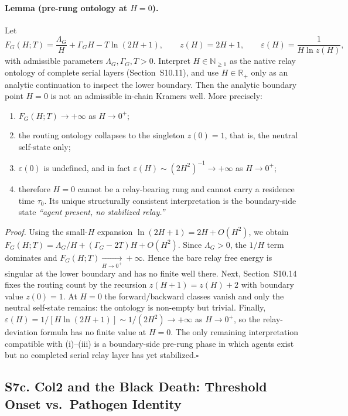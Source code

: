 \documentclass[11pt]{article}
\begin{document}
\paragraph{Lemma (pre-rung ontology at $H{=}0$).}
Let
\[
F_G(H;T)=\frac{\Lambda_G}{H}+\Gamma_G H-T\ln(2H+1),\qquad
z(H)=2H+1,\qquad
\varepsilon(H)=\frac{1}{H\ln z(H)},
\]
with admissible parameters $\Lambda_G,\Gamma_G,T>0$. Interpret
$H\in\mathbb{N}_{\ge 1}$ as the native relay ontology of complete serial
layers (Section~S10.11), and use $H\in\mathbb{R}_{+}$ only as an analytic
continuation to inspect the lower boundary. Then the analytic boundary
point $H{=}0$ is not an admissible in-chain Kramers well. More precisely:
\begin{enumerate}
\item[(i)] $F_G(H;T)\to +\infty$ as $H\to 0^{+}$;
\item[(ii)] the routing ontology collapses to the singleton $z(0)=1$,
that is, the neutral self-state only;
\item[(iii)] $\varepsilon(0)$ is undefined, and in fact
$\varepsilon(H)\sim (2H^{2})^{-1}\to+\infty$ as $H\to 0^{+}$;
\item[(iv)] therefore $H{=}0$ cannot be a relay-bearing rung and cannot
carry a residence time $\tau_{0}$. Its unique structurally consistent
interpretation is the boundary-side state
\emph{``agent present, no stabilized relay.''}
\end{enumerate}

\emph{Proof.}
Using the small-$H$ expansion $\ln(2H+1)=2H+O(H^{2})$, we obtain
$F_G(H;T)=\Lambda_G/H+(\Gamma_G-2T)H+O(H^{2})$.
Since $\Lambda_G>0$, the $1/H$ term dominates and
$F_G(H;T)\xrightarrow[H\to 0^{+}]{}+\infty$.
Hence the bare relay free energy is singular at the lower boundary and has
no finite well there.
Next, Section~S10.14 fixes the routing count by the recursion
$z(H+1)=z(H)+2$ with boundary value $z(0)=1$. At $H{=}0$ the forward/backward
classes vanish and only the neutral self-state remains: the ontology is
non-empty but trivial.
Finally, $\varepsilon(H)=1/[H\ln(2H+1)]\sim 1/(2H^{2})\to+\infty$ as
$H\to 0^{+}$, so the relay-deviation formula has no finite value at $H{=}0$.
The only remaining interpretation compatible with (i)--(iii) is a boundary-side
pre-rung phase in which agents exist but no completed serial relay layer has
yet stabilized.\hfill$\square$


\subsection*{S7c. Col2 and the Black Death: Threshold Onset vs.\ Pathogen Identity}
\end{document}
